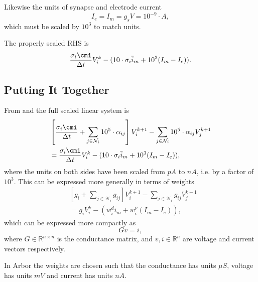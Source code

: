 Likewise the units of synapse and electrode current
\begin{equation}
    \label{eq:Im_unit}
    \unit{ I_e } = \unit{ I_m } = \unit{ g_s } \unit{ V }
                 = 10^{-9}\cdot A,
\end{equation}
which must be scaled by $10^3$ to match units.

The properly scaled RHS is
\begin{equation}
    \label{eq:linsys_RHS_scaled}
    \frac{\sigma_i \cmi}{\Delta t} V_i^k -
        (10\cdot\sigma_i \bar{i}_m + 10^3(I_m - I_e)).
\end{equation}

\subsection{Putting It Together}
From  and  the full scaled linear system is
\begin{align}
    &
    \left[
        \frac{\sigma_i \cmi}{\Delta t} + \sum_{j\in\mathcal{N}_i} {10^5\cdot\alpha_{ij}}
    \right]
    V_i^{k+1} - \sum_{j\in\mathcal{N}_i} { 10^5\cdot\alpha_{ij} V_j^{k+1}} \nonumber \\
       & =
    \frac{\sigma_i \cmi}{\Delta t} V_i^k -
        (10\cdot\sigma_i \bar{i}_m + 10^3(I_m - I_e)),
\end{align}
where the units on both sides have been scaled from $pA$ to $nA$, i.e. by a factor of $10^3$.
This can be expressed more generally in terms of weights
\begin{align}
    &
    \left[
        g_i + \sum_{j\in\mathcal{N}_i} {g_{ij}}
    \right]
    V_i^{k+1} - \sum_{j\in\mathcal{N}_i} { g_{ij} V_j^{k+1}} \nonumber \\
       & =
    g_i V_i^k -
        (w_i^d \bar{i}_m + w_i^p(I_m - I_e)),
\end{align}
which can be expressed more compactly as
\begin{equation}
    Gv=i,
\end{equation}
where $G\in\mathbb{R}^{n\times n}$ is the conductance matrix, and $v, i \in \mathbb{R}^{n}$ are voltage and current vectors respectively.

In Arbor the weights are chosen such that the conductance has units $\mu S$, voltage has units $mV$ and current has units $nA$.

